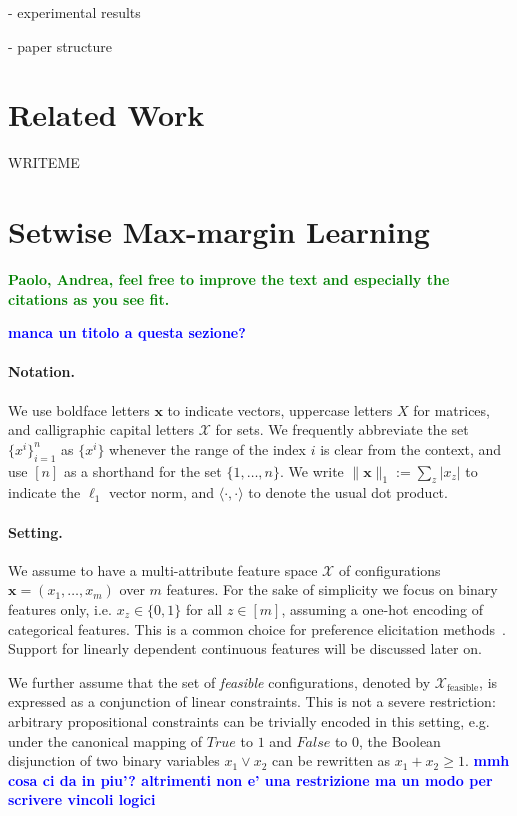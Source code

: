 \documentclass{article}
\renewcommand\[{\begin{equation}}
\renewcommand\]{\end{equation}}
\newcommand{\calvar}[1]{\ensuremath{\mathcal{#1}}}
\newcommand{\calX}{\calvar{X}}
\newcommand{\vecvar}[1]{\ensuremath{\boldsymbol{#1}}}
\newcommand{\vx}{\vecvar{x}}
\newcommand{\andrea}[1]{{\bf \textcolor{blue}{{\fbox{Andrea:} #1}}}}
\newcommand{\stefano}[1]{{\bf \textcolor{green}{{\fbox{Stefano:} #1}}}}
\begin{document}
- experimental results

- paper structure


\section{Related Work}

WRITEME

\section{Setwise Max-margin Learning}

\stefano{Paolo, Andrea, feel free to improve the text and especially the
citations as you see fit.}

\andrea{manca un titolo a questa sezione?}

\paragraph{Notation.} We use boldface letters $\vx$ to indicate vectors,
uppercase letters $X$ for matrices, and calligraphic capital letters $\calX$
for sets. We frequently abbreviate the set $\{ x^i \}_{i=1}^n$ as $\{ x^i \}$
whenever the range of the index $i$ is clear from the context, and use $[n]$ as
a shorthand for the set $\{1, \ldots, n\}$. We write $\|\vx\|_1 := \sum_z |x_z|$
to indicate the $\ell_1$ vector norm, and $\langle \cdot, \cdot \rangle$ to
denote the usual dot product.

\paragraph{Setting.} We assume to have a multi-attribute feature space
$\calX$ of configurations $\vx = (x_1, \ldots, x_m)$ over $m$
features. For the sake of simplicity we focus on binary features only,
i.e. $x_z\in\{0,1\}$ for all $z\in[m]$, assuming a one-hot encoding of
categorical features. This is a common choice for preference
elicitation methods~\cite{guo2010real,viappiani2010optimal}. Support
for linearly dependent continuous features will be discussed later on.

We further assume that the set of {\em feasible} configurations, denoted by
$\calX_\text{feasible}$, is expressed as
a conjunction of linear constraints. This is not a severe restriction:
arbitrary propositional constraints can be trivially encoded in this setting,
e.g. under the canonical mapping of $True$ to $1$ and $False$ to $0$, the
Boolean disjunction of two binary variables $x_1 \lor x_2$ can be rewritten as
$x_1 + x_2 \ge 1$. \andrea{mmh cosa ci da in piu'? altrimenti non e' una restrizione ma un modo 
per scrivere vincoli logici}
\end{document}

